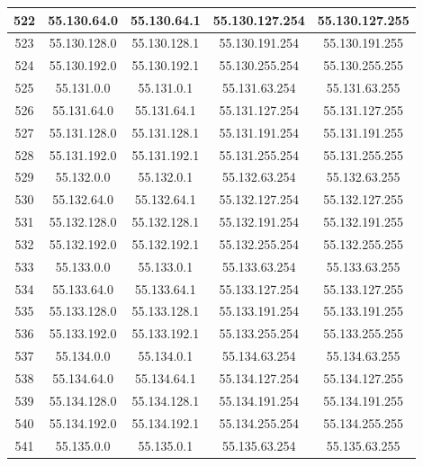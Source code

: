\documentclass[letterpaper,12pt]{article}
\begin{document}
\begin{center}
\begin{longtable}{|c|c|c|c|c|}
                522 & 55.130.64.0 & 55.130.64.1 & 55.130.127.254 & 55.130.127.255 \\ \hline
                523 & 55.130.128.0 & 55.130.128.1 & 55.130.191.254 & 55.130.191.255 \\ \hline
                524 & 55.130.192.0 & 55.130.192.1 & 55.130.255.254 & 55.130.255.255 \\ \hline
                525 & 55.131.0.0 & 55.131.0.1 & 55.131.63.254 & 55.131.63.255 \\ \hline
                526 & 55.131.64.0 & 55.131.64.1 & 55.131.127.254 & 55.131.127.255 \\ \hline
                527 & 55.131.128.0 & 55.131.128.1 & 55.131.191.254 & 55.131.191.255 \\ \hline
                528 & 55.131.192.0 & 55.131.192.1 & 55.131.255.254 & 55.131.255.255 \\ \hline
                529 & 55.132.0.0 & 55.132.0.1 & 55.132.63.254 & 55.132.63.255 \\ \hline
                530 & 55.132.64.0 & 55.132.64.1 & 55.132.127.254 & 55.132.127.255 \\ \hline
                531 & 55.132.128.0 & 55.132.128.1 & 55.132.191.254 & 55.132.191.255 \\ \hline
                532 & 55.132.192.0 & 55.132.192.1 & 55.132.255.254 & 55.132.255.255 \\ \hline
                533 & 55.133.0.0 & 55.133.0.1 & 55.133.63.254 & 55.133.63.255 \\ \hline
                534 & 55.133.64.0 & 55.133.64.1 & 55.133.127.254 & 55.133.127.255 \\ \hline
                535 & 55.133.128.0 & 55.133.128.1 & 55.133.191.254 & 55.133.191.255 \\ \hline
                536 & 55.133.192.0 & 55.133.192.1 & 55.133.255.254 & 55.133.255.255 \\ \hline
                537 & 55.134.0.0 & 55.134.0.1 & 55.134.63.254 & 55.134.63.255 \\ \hline
                538 & 55.134.64.0 & 55.134.64.1 & 55.134.127.254 & 55.134.127.255 \\ \hline
                539 & 55.134.128.0 & 55.134.128.1 & 55.134.191.254 & 55.134.191.255 \\ \hline
                540 & 55.134.192.0 & 55.134.192.1 & 55.134.255.254 & 55.134.255.255 \\ \hline
                541 & 55.135.0.0 & 55.135.0.1 & 55.135.63.254 & 55.135.63.255 \\ \hline

\end{longtable}
\end{center}
\end{document}
